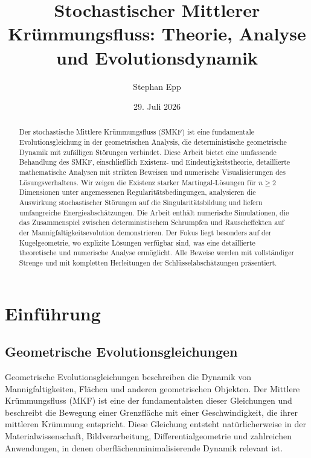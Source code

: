 \documentclass[a4paper,12pt]{article}
\title{Stochastischer Mittlerer Krümmungsfluss: Theorie, Analyse und Evolutionsdynamik}
\author{Stephan Epp}
\date{29. Juli 2026}
\theoremstyle{definition}
\begin{document}
\maketitle

\begin{abstract}

Der stochastische Mittlere Krümmungsfluss (SMKF) ist eine fundamentale Evolutionsgleichung in der geometrischen Analysis, die deterministische geometrische Dynamik mit zufälligen Störungen verbindet. Diese Arbeit bietet eine umfassende Behandlung des SMKF, einschließlich Existenz- und Eindeutigkeitstheorie, detaillierte mathematische Analysen mit strikten Beweisen und numerische Visualisierungen des Lösungsverhaltens. Wir zeigen die Existenz starker Martingal-Lösungen für $n \geq 2$ Dimensionen unter angemessenen Regularitätsbedingungen, analysieren die Auswirkung stochastischer Störungen auf die Singularitätsbildung und liefern umfangreiche Energieabschätzungen. Die Arbeit enthält numerische Simulationen, die das Zusammenspiel zwischen deterministischem Schrumpfen und Rauscheffekten auf der Mannigfaltigkeitsevolution demonstrieren. Der Fokus liegt besonders auf der Kugelgeometrie, wo explizite Lösungen verfügbar sind, was eine detaillierte theoretische und numerische Analyse ermöglicht. Alle Beweise werden mit vollständiger Strenge und mit kompletten Herleitungen der Schlüsselabschätzungen präsentiert.

\end{abstract}

\tableofcontents
\newpage

\section{Einführung}

\subsection{Geometrische Evolutionsgleichungen}

Geometrische Evolutionsgleichungen beschreiben die Dynamik von Mannigfaltigkeiten, Flächen und anderen geometrischen Objekten. Der Mittlere Krümmungsfluss (MKF) ist eine der fundamentalsten dieser Gleichungen und beschreibt die Bewegung einer Grenzfläche mit einer Geschwindigkeit, die ihrer mittleren Krümmung entspricht. Diese Gleichung entsteht natürlicherweise in der Materialwissenschaft, Bildverarbeitung, Differentialgeometrie und zahlreichen Anwendungen, in denen oberflächenminimalisierende Dynamik relevant ist.
\end{document}
